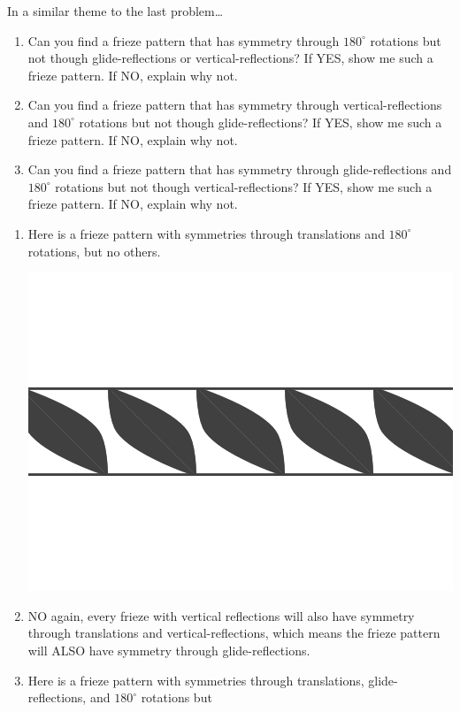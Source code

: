 \documentclass[noauthor,nooutcomes,12pt,hints]{ximera}
\begin{document}
\begin{question}
  In a similar theme to the last problem\dots 
  \begin{enumerate}
    \item Can you find a frieze pattern that has symmetry through
      $180^\circ$ rotations but not though glide-reflections or
      vertical-reflections? If YES, show me such a frieze pattern. If
      NO, explain why not.
      
    \item Can you find a frieze pattern that has symmetry through
      vertical-reflections and $180^\circ$ rotations but not though
      glide-reflections? If YES, show me such a frieze pattern. If NO,
      explain why not.

    \item Can you find a frieze pattern that has symmetry through
      glide-reflections and $180^\circ$ rotations but not though
      vertical-reflections? If YES, show me such a frieze pattern. If
      NO, explain why not.
  \end{enumerate}
  \begin{freeResponse}
    \begin{enumerate}
    \item Here is a frieze pattern with symmetries through
      translations and $180^\circ$ rotations, but no others.
      \begin{center}
        \includegraphics[width=.6\textwidth]{ansR.png}
      \end{center}
    \item NO again, every frieze with vertical reflections will also
      have symmetry through translations and vertical-reflections,
      which means the frieze pattern will ALSO have symmetry through
      glide-reflections.
    \item Here is a frieze pattern with symmetries through
      translations, glide-reflections, and $180^\circ$ rotations but

\end{enumerate}
\end{freeResponse}
\end{question}
\end{document}
